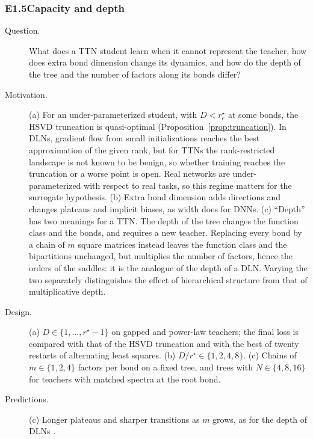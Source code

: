 \documentclass[11pt]{article}
\theoremstyle{definition}
\numberwithin{equation}{section}
\begin{document}
\subsubsection*{E1.5\quad Capacity and depth}
\begin{description}
\item[Question.] What does a TTN student learn when it cannot represent the teacher, how does extra bond dimension change its dynamics, and how do the depth of the tree and the number of factors along its bonds differ?
\item[Motivation.] (a) For an under-parameterized student, with $D<r^\star_e$ at some bonds, the HSVD truncation is quasi-optimal (Proposition~\ref{prop:truncation}). In DLNs, gradient flow from small initializations reaches the best approximation of the given rank, but for TTNs the rank-restricted landscape is not known to be benign, so whether training reaches the truncation or a worse point is open. Real networks are under-parameterized with respect to real tasks, so this regime matters for the surrogate hypothesis. (b) Extra bond dimension adds directions and changes plateaus and implicit biases, as width does for DNNs. (c) ``Depth'' has two meanings for a TTN. The depth of the tree changes the function class and the bonds, and requires a new teacher. Replacing every bond by a chain of $m$ square matrices instead leaves the function class and the bipartitions unchanged, but multiplies the number of factors, hence the orders of the saddles: it is the analogue of the depth of a DLN. Varying the two separately distinguishes the effect of hierarchical structure from that of multiplicative depth.
\item[Design.] (a) $D\in\{1,\dots,r^\star-1\}$ on gapped and power-law teachers; the final loss is compared with that of the HSVD truncation and with the best of twenty restarts of alternating least squares. (b) $D/r^\star\in\{1,2,4,8\}$. (c) Chains of $m\in\{1,2,4\}$ factors per bond on a fixed tree, and trees with $N\in\{4,8,16\}$ for teachers with matched spectra at the root bond.
\item[Predictions.] (c) Longer plateaus and sharper transitions as $m$ grows, as for the depth of DLNs \citep[eq.~(4.7)]{hfl_diagonal}.
\end{description}
\end{document}
